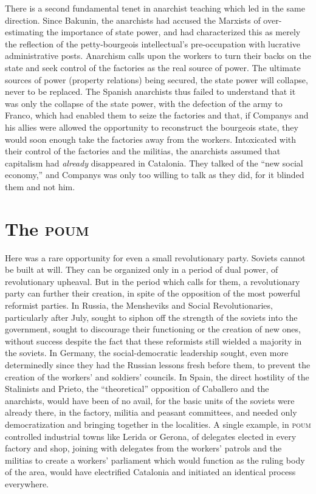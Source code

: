 There is a second fundamental tenet in anarchist teaching which led in the same direction. Since Bakunin, the anarchists had accused the Marxists of over-estimating the importance of state power, and had characterized this as merely the reflection of the petty-bourgeois intellectual’s pre-occupation with lucrative administrative posts. Anarchism calls upon the workers to turn their backs on the state and seek control of the factories as the real source of power. The ultimate sources of power (property relations) being secured, the state power will collapse, never to be replaced. The Spanish anarchists thus failed to understand that it was only the collapse of the state power, with the defection of the army to Franco, which had enabled them to seize the factories and that, if Companys and his allies were allowed the opportunity to reconstruct the bourgeois state, they would soon enough take the factories away from the workers. Intoxicated with their control of the factories and the militias, the anarchists assumed that capitalism had \emph{already} disappeared in Catalonia. They talked of the ``new social economy,'' and Companys was only too willing to talk as they did, for it blinded them and not him.

\section{The \textsc{poum}}

Here was a rare opportunity for even a small revolutionary party. Soviets cannot be built at will. They can be organized only in a period of dual power, of revolutionary upheaval. But in the period which calls for them, a revolutionary party can further their creation, in spite of the opposition of the most powerful reformist parties. In Russia, the Mensheviks and Social Revolutionaries, particularly after July, sought to siphon off the strength of the soviets into the government, sought to discourage their functioning or the creation of new ones, without success despite the fact that these reformists still wielded a majority in the soviets. In Germany, the social-democratic leadership sought, even more determinedly since they had the Russian lessons fresh before them, to prevent the creation of the workers’ and soldiers’ councils. In Spain, the direct hostility of the Stalinists and Prieto, the ``theoretical'' opposition of Caballero and the anarchists, would have been of no avail, for the basic units of the soviets were already there, in the factory, militia and peasant committees, and needed only democratization and bringing together in the localities. A single example, in \textsc{poum} controlled industrial towns like Lerida or Gerona, of delegates elected in every factory and shop, joining with delegates from the workers’ patrols and the militias to create a workers’ parliament which would function as the ruling body of the area, would have electrified Catalonia and initiated an identical process everywhere.


